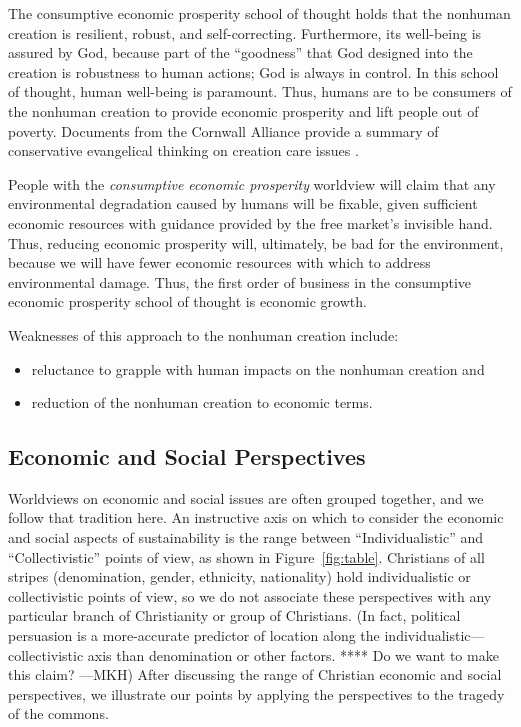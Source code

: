 \documentclass[12pt]{article}
\begin{document}
The consumptive economic prosperity school of thought 
holds that the nonhuman creation is resilient, robust, and self-correcting.
Furthermore, its well-being is assured by God, 
because part of the ``goodness'' that God designed into the creation
is robustness to human actions; 
God is always in control.
In this school of thought, human well-being is paramount. 
Thus, humans are to be consumers of the nonhuman creation 
to provide economic prosperity and
lift people out of poverty.
Documents from the Cornwall Alliance 
provide a summary of conservative evangelical thinking on creation care issues
\autocite{Cornwall:2006aa}.

People with the \emph{consumptive economic prosperity} worldview
will claim that any environmental degradation caused by humans will be fixable,
given sufficient economic resources with guidance provided by the free market's invisible hand.
Thus, reducing economic prosperity will, ultimately, be bad for the environment, because
we will have fewer economic resources with which to address environmental damage.
Thus, the first order of business in the consumptive economic prosperity school of thought
is economic growth. 

Weaknesses of this approach to the nonhuman creation include:
%
\begin{itemize}

  \item reluctance to grapple with human impacts on the nonhuman creation and 

  \item reduction of the nonhuman creation to economic terms.

\end{itemize}


\subsection{Economic and Social Perspectives}
\label{sec:economic_and_social}

Worldviews on economic and social issues are often grouped together, and
we follow that tradition here. 
An instructive axis on which to consider the economic and social aspects of sustainability
is the range between ``Individualistic'' and ``Collectivistic'' points of view, 
as shown in Figure~\ref{fig:table}.
Christians of all stripes (denomination, gender, ethnicity, nationality)
hold individualistic or collectivistic points of view, 
so we do not associate these perspectives with any particular branch of Christianity
or group of Christians.
(In fact, political persuasion is a more-accurate predictor of location along the 
individualistic---collectivistic axis than denomination or other factors.
**** Do we want to make this claim? ---MKH)
After discussing the range of Christian economic and social perspectives,
we illustrate our points by applying the perspectives to the 
tragedy of the commons. 
\end{document}
